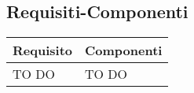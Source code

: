 \subsection{Requisiti-Componenti} %
\label{sub:componenti_requisiti}
\begin{center}
\def\arraystretch{1.5}
\bgroup

\begin{longtable}{| p{4cm} | p{8cm} |}
\hline
\textbf{Requisito} & \textbf{Componenti} \\
\hline
TO DO   &  TO DO \\
\hline
\end{longtable}
\egroup
\end{center}
